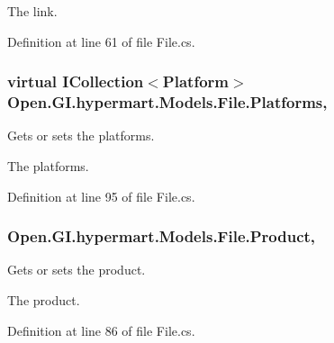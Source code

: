 The link. 

Definition at line 61 of file File.\+cs.

\hypertarget{class_open_1_1_g_i_1_1hypermart_1_1_models_1_1_file_a7cf38ed851b70df6af9b0606c4d744ed}{}
\subsubsection[{Platforms}]{\setlength{\rightskip}{0pt plus 5cm}virtual I\+Collection$<${\bf Platform}$>$ Open.\+G\+I.\+hypermart.\+Models.\+File.\+Platforms\hspace{0.3cm}{\ttfamily [get]}, {\ttfamily [set]}}\label{class_open_1_1_g_i_1_1hypermart_1_1_models_1_1_file_a7cf38ed851b70df6af9b0606c4d744ed}


Gets or sets the platforms. 

The platforms. 

Definition at line 95 of file File.\+cs.

\hypertarget{class_open_1_1_g_i_1_1hypermart_1_1_models_1_1_file_ad2c5d00ebf4d4414a96911606fecc6cb}{}
\subsubsection[{Product}]{ Open.\+G\+I.\+hypermart.\+Models.\+File.\+Product\hspace{0.3cm}{\ttfamily [get]}, {\ttfamily [set]}}\label{class_open_1_1_g_i_1_1hypermart_1_1_models_1_1_file_ad2c5d00ebf4d4414a96911606fecc6cb}


Gets or sets the product. 

The product. 

Definition at line 86 of file File.\+cs.

\hypertarget{class_open_1_1_g_i_1_1hypermart_1_1_models_1_1_file_ad0b974d38df4491ce90d1d5e884a56a8}{}
